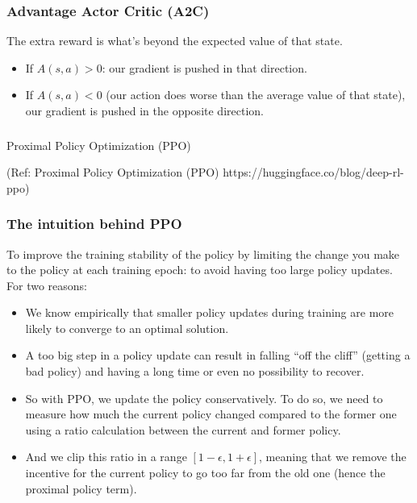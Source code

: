 \begin{frame}[fragile]\frametitle{Advantage Actor Critic (A2C)}

The extra reward is what's beyond the expected value of that state.

\begin{itemize}
\item If $A(s,a) > 0$: our gradient is pushed in that direction.
\item If $A(s,a) < 0$ (our action does worse than the average value of that state), our gradient is pushed in the opposite direction.
\end{itemize}

\end{frame}

\begin{frame}[fragile]\frametitle{}
\begin{center}
{\Large Proximal Policy Optimization (PPO)}
\end{center}

{\tiny (Ref: Proximal Policy Optimization (PPO) https://huggingface.co/blog/deep-rl-ppo)}

\end{frame}

\begin{frame}[fragile]\frametitle{The intuition behind PPO}

To improve the training stability of the policy by limiting the change you make to the policy at each training epoch: to avoid having too large policy updates. For two reasons:

\begin{itemize}
\item We know empirically that smaller policy updates during training are more likely to converge to an optimal solution.
\item A too big step in a policy update can result in falling “off the cliff” (getting a bad policy) and having a long time or even no possibility to recover.
\item So with PPO, we update the policy conservatively. To do so, we need to measure how much the current policy changed compared to the former one using a ratio calculation between the current and former policy. 
\item And we clip this ratio in a range $[1 - \epsilon, 1 + \epsilon]$, meaning that we remove the incentive for the current policy to go too far from the old one (hence the proximal policy term).
\end{itemize}

\end{frame}


